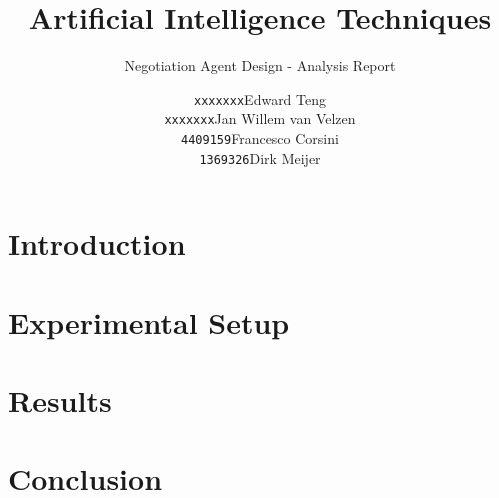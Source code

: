 \documentclass[a4,11pt]{scrartcl}
\title{Artificial Intelligence Techniques}
\subtitle{Negotiation Agent Design - Analysis Report}
\author{
\begin{tabular}{ll}
\texttt{xxxxxxx}&Edward Teng\\
\texttt{xxxxxxx}&Jan Willem van Velzen\\
\texttt{4409159}&Francesco Corsini\\
\texttt{1369326}&Dirk Meijer
\end{tabular}}
\begin{document}
    \maketitle{}
    \tableofcontents
    \section{Introduction}
    
    \section{Experimental Setup}
    
    \section{Results}
    
    \section{Conclusion}
    
    
\end{document}
